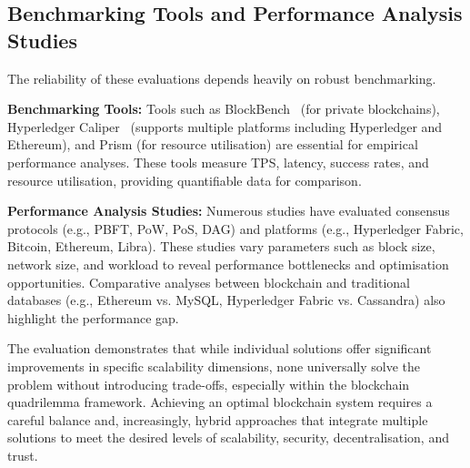 

\subsection{Benchmarking Tools and Performance Analysis Studies}
The reliability of these evaluations depends heavily on robust benchmarking.

\textbf{Benchmarking Tools:} Tools such as BlockBench~\cite{dinh2017blockbench} (for private blockchains), Hyperledger Caliper~\cite{hyperledger2020caliper} (supports multiple platforms including Hyperledger and Ethereum), and Prism (for resource utilisation) are essential for empirical performance analyses. These tools measure TPS, latency, success rates, and resource utilisation, providing quantifiable data for comparison.

\textbf{Performance Analysis Studies:} Numerous studies have evaluated consensus protocols (e.g., PBFT, PoW, PoS, DAG) and platforms (e.g., Hyperledger Fabric, Bitcoin, Ethereum, Libra). These studies vary parameters such as block size, network size, and workload to reveal performance bottlenecks and optimisation opportunities. Comparative analyses between blockchain and traditional databases (e.g., Ethereum vs. MySQL, Hyperledger Fabric vs. Cassandra) also highlight the performance gap.

\bigskip
The evaluation demonstrates that while individual solutions offer significant improvements in specific scalability dimensions, none universally solve the problem without introducing trade-offs, especially within the blockchain quadrilemma framework. Achieving an optimal blockchain system requires a careful balance and, increasingly, hybrid approaches that integrate multiple solutions to meet the desired levels of scalability, security, decentralisation, and trust.


